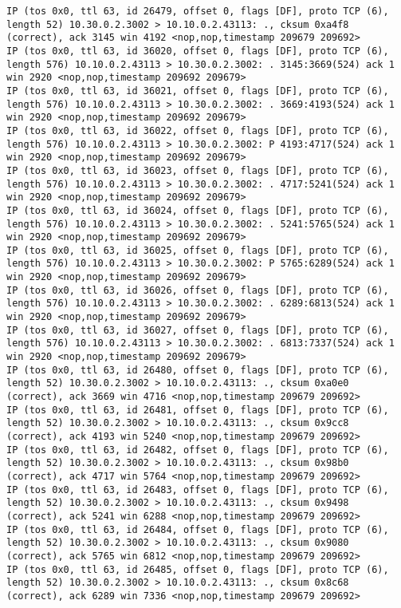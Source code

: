 \documentclass[a4paper,12pt]{article}
\begin{document}
\begin{lstlisting}
IP (tos 0x0, ttl 63, id 26479, offset 0, flags [DF], proto TCP (6), length 52) 10.30.0.2.3002 > 10.10.0.2.43113: ., cksum 0xa4f8 (correct), ack 3145 win 4192 <nop,nop,timestamp 209679 209692>
IP (tos 0x0, ttl 63, id 36020, offset 0, flags [DF], proto TCP (6), length 576) 10.10.0.2.43113 > 10.30.0.2.3002: . 3145:3669(524) ack 1 win 2920 <nop,nop,timestamp 209692 209679>
IP (tos 0x0, ttl 63, id 36021, offset 0, flags [DF], proto TCP (6), length 576) 10.10.0.2.43113 > 10.30.0.2.3002: . 3669:4193(524) ack 1 win 2920 <nop,nop,timestamp 209692 209679>
IP (tos 0x0, ttl 63, id 36022, offset 0, flags [DF], proto TCP (6), length 576) 10.10.0.2.43113 > 10.30.0.2.3002: P 4193:4717(524) ack 1 win 2920 <nop,nop,timestamp 209692 209679>
IP (tos 0x0, ttl 63, id 36023, offset 0, flags [DF], proto TCP (6), length 576) 10.10.0.2.43113 > 10.30.0.2.3002: . 4717:5241(524) ack 1 win 2920 <nop,nop,timestamp 209692 209679>
IP (tos 0x0, ttl 63, id 36024, offset 0, flags [DF], proto TCP (6), length 576) 10.10.0.2.43113 > 10.30.0.2.3002: . 5241:5765(524) ack 1 win 2920 <nop,nop,timestamp 209692 209679>
IP (tos 0x0, ttl 63, id 36025, offset 0, flags [DF], proto TCP (6), length 576) 10.10.0.2.43113 > 10.30.0.2.3002: P 5765:6289(524) ack 1 win 2920 <nop,nop,timestamp 209692 209679>
IP (tos 0x0, ttl 63, id 36026, offset 0, flags [DF], proto TCP (6), length 576) 10.10.0.2.43113 > 10.30.0.2.3002: . 6289:6813(524) ack 1 win 2920 <nop,nop,timestamp 209692 209679>
IP (tos 0x0, ttl 63, id 36027, offset 0, flags [DF], proto TCP (6), length 576) 10.10.0.2.43113 > 10.30.0.2.3002: . 6813:7337(524) ack 1 win 2920 <nop,nop,timestamp 209692 209679>
IP (tos 0x0, ttl 63, id 26480, offset 0, flags [DF], proto TCP (6), length 52) 10.30.0.2.3002 > 10.10.0.2.43113: ., cksum 0xa0e0 (correct), ack 3669 win 4716 <nop,nop,timestamp 209679 209692>
IP (tos 0x0, ttl 63, id 26481, offset 0, flags [DF], proto TCP (6), length 52) 10.30.0.2.3002 > 10.10.0.2.43113: ., cksum 0x9cc8 (correct), ack 4193 win 5240 <nop,nop,timestamp 209679 209692>
IP (tos 0x0, ttl 63, id 26482, offset 0, flags [DF], proto TCP (6), length 52) 10.30.0.2.3002 > 10.10.0.2.43113: ., cksum 0x98b0 (correct), ack 4717 win 5764 <nop,nop,timestamp 209679 209692>
IP (tos 0x0, ttl 63, id 26483, offset 0, flags [DF], proto TCP (6), length 52) 10.30.0.2.3002 > 10.10.0.2.43113: ., cksum 0x9498 (correct), ack 5241 win 6288 <nop,nop,timestamp 209679 209692>
IP (tos 0x0, ttl 63, id 26484, offset 0, flags [DF], proto TCP (6), length 52) 10.30.0.2.3002 > 10.10.0.2.43113: ., cksum 0x9080 (correct), ack 5765 win 6812 <nop,nop,timestamp 209679 209692>
IP (tos 0x0, ttl 63, id 26485, offset 0, flags [DF], proto TCP (6), length 52) 10.30.0.2.3002 > 10.10.0.2.43113: ., cksum 0x8c68 (correct), ack 6289 win 7336 <nop,nop,timestamp 209679 209692>

\end{lstlisting}
\end{document}

